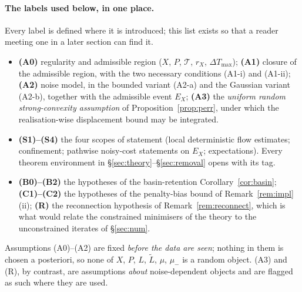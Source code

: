 \documentclass[11pt]{article}
\theoremstyle{remark}\newtheorem{remark}{Remark}
\begin{document}
\paragraph{The labels used below, in one place.} Every label is defined where it is introduced; this list exists so that a reader meeting one in a later section can find it.
\begin{itemize}[nosep,leftmargin=1.6em]
\item \textbf{(A0)} regularity and admissible region ($X$, $P$, $\mathcal T$, $r_X$, $\Delta T_{\max}$); \textbf{(A1)} closure of the admissible region, with the two necessary conditions (A1-i) and (A1-ii); \textbf{(A2)} noise model, in the bounded variant (A2-a) and the Gaussian variant (A2-b), together with the admissible event $E_X$; \textbf{(A3)} the \emph{uniform random strong-convexity assumption} of Proposition~\ref{prop:perr}, under which the realisation-wise displacement bound may be integrated.
\item \textbf{(S1)--(S4)} the four scopes of statement (local deterministic flow estimates; confinement; pathwise noisy-cost statements on $E_X$; expectations). Every theorem environment in \S\ref{sec:theory}--\S\ref{sec:removal} opens with its tag.
\item \textbf{(B0)--(B2)} the hypotheses of the basin-retention Corollary~\ref{cor:basin}; \textbf{(C1)--(C2)} the hypotheses of the penalty-bias bound of Remark~\ref{rem:impl}(ii); \textbf{(R)} the reconnection hypothesis of Remark~\ref{rem:reconnect}, which is what would relate the constrained minimisers of the theory to the unconstrained iterates of \S\ref{sec:num}.
\end{itemize}
Assumptions (A0)--(A2) are fixed \emph{before the data are seen}; nothing in them is chosen a posteriori, so none of $X$, $P$, $L$, $\tilde L$, $\mu$, $\mu_-$ is a random object. (A3) and (R), by contrast, are assumptions \emph{about} noise-dependent objects and are flagged as such where they are used.
\end{document}
